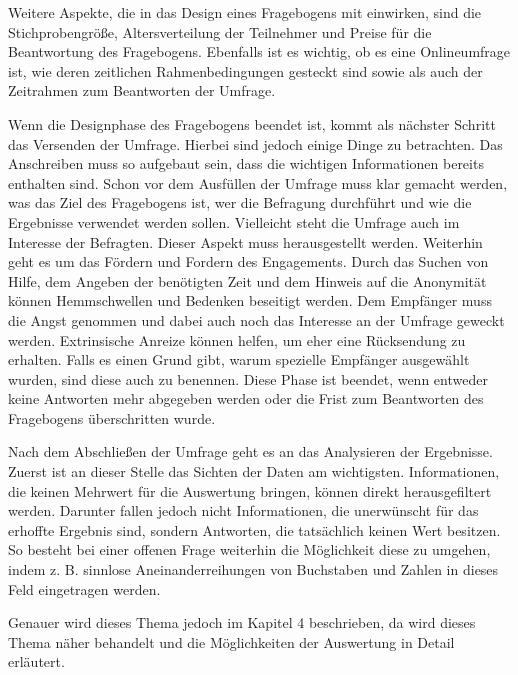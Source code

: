 Weitere Aspekte, die in das Design eines Fragebogens mit einwirken, sind die Stichprobengröße, Altersverteilung der Teilnehmer und Preise für die Beantwortung des Fragebogens. Ebenfalls ist es wichtig, ob es eine Onlineumfrage ist, wie deren zeitlichen Rahmenbedingungen gesteckt sind sowie als auch der Zeitrahmen zum Beantworten der Umfrage\autocite[Chapter 4
Putting It Together]{Perfect}.


Wenn die Designphase des Fragebogens beendet ist, kommt als nächster Schritt das Versenden der Umfrage.
Hierbei sind jedoch einige Dinge zu betrachten. Das Anschreiben muss so aufgebaut sein, dass die wichtigen Informationen bereits enthalten sind. 
Schon vor dem Ausfüllen der Umfrage muss klar gemacht werden, was das Ziel des Fragebogens ist, wer die Befragung durchführt und wie die Ergebnisse verwendet werden sollen. Vielleicht steht die Umfrage auch im Interesse der Befragten. Dieser Aspekt muss herausgestellt werden. 
Weiterhin geht es um das Fördern und Fordern des Engagements. 
Durch das Suchen von Hilfe, dem Angeben der benötigten Zeit und dem Hinweis auf die Anonymität können Hemmschwellen und Bedenken beseitigt werden. 
Dem Empfänger muss die Angst genommen und dabei auch noch das Interesse an der Umfrage geweckt werden. 
Extrinsische Anreize können helfen, um eher eine Rücksendung zu erhalten.
Falls es einen Grund gibt, warum spezielle Empfänger ausgewählt wurden, sind diese auch zu benennen.
Diese Phase ist beendet, wenn entweder keine Antworten mehr abgegeben werden oder die Frist zum Beantworten des Fragebogens überschritten wurde\autocite[S.29]{MwdeF}.


Nach dem Abschließen der Umfrage geht es an das Analysieren der Ergebnisse. 
Zuerst ist an dieser Stelle das Sichten der Daten am wichtigsten.
Informationen, die keinen Mehrwert für die Auswertung bringen, können direkt herausgefiltert werden.
Darunter fallen jedoch nicht Informationen, die unerwünscht für das erhoffte Ergebnis sind, sondern Antworten, die tatsächlich keinen Wert besitzen.
So besteht bei einer offenen Frage weiterhin die Möglichkeit diese zu umgehen, indem z. B. sinnlose Aneinanderreihungen von Buchstaben und Zahlen in dieses Feld eingetragen werden.

Genauer wird dieses Thema jedoch im Kapitel 4 beschrieben, da wird dieses Thema näher behandelt und die Möglichkeiten der Auswertung in Detail erläutert\autocite[S.45]{MwdeF}.	%

